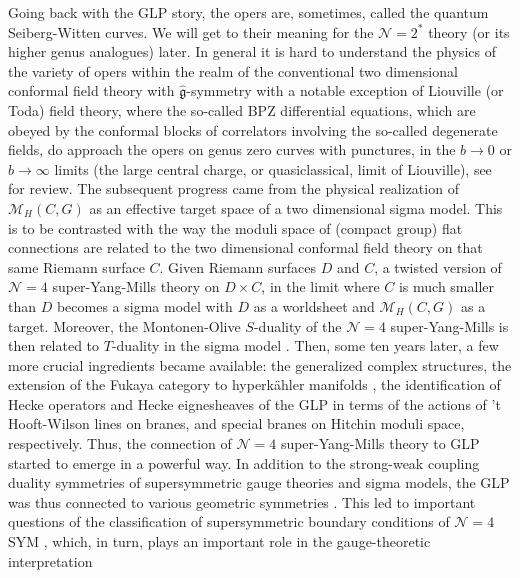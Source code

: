 \documentclass[12pt]{article}
\newcommand\CalN{\mathcal{N}}
\newcommand\CalM{\mathcal{M}}
\begin{document}
Going back with the GLP story, the opers are, sometimes, called the quantum Seiberg-Witten curves.  We will get to their meaning for the ${\CalN}=2^{*}$ theory (or its higher genus analogues) later. 
In general it is hard
to understand the physics of the variety of opers within the realm of the conventional
two dimensional conformal field theory with $\widehat{\mathfrak{g}}$-symmetry with a notable exception of Liouville (or Toda) field theory, where the
so-called BPZ differential equations, which are obeyed
by the conformal blocks of correlators involving the so-called
degenerate fields, do approach the opers on genus zero curves with punctures, in the $b \to 0$ or $b \to \infty$ limits
(the large central charge, or quasiclassical, limit of Liouville), see \cite{Teschner:2010je} for review. 
The subsequent progress came from the physical realization of ${\CalM}_{H}(C, G)$ as an effective target space of a two dimensional 
sigma model. This is to be contrasted with the way the moduli space of (compact group) flat connections are related to the two dimensional conformal field theory on that same Riemann surface $C$. 
Given Riemann surfaces $D$ and $C$, a twisted version of ${\CalN}=4$ super-Yang-Mills theory 
on $D \times C$, in the limit where $C$ is much smaller than $D$ 
becomes a sigma model with $D$ as a worldsheet and ${\CalM}_{H}(C, G)$ as a target. Moreover, the Montonen-Olive $S$-duality of the ${\CalN}=4$ super-Yang-Mills is then related to $T$-duality in the sigma model
\cite{Bershadsky:1995vm,Harvey:1995tg}. Then, some ten years later, a few more crucial ingredients became available: the
generalized complex structures, the extension of the Fukaya category to hyperk{\"a}hler manifolds \cite{Kapustin:2001ij}, the identification of Hecke operators and Hecke eignesheaves 
of the GLP in terms of the actions of 't Hooft-Wilson lines on branes, 
and special branes on Hitchin moduli space, respectively. Thus, the connection of ${\CalN}=4$ super-Yang-Mills theory to GLP started to emerge \cite{Kapustin:2006pk}
in a powerful way. In addition to the strong-weak coupling duality symmetries of supersymmetric gauge theories 
and sigma models, the GLP was thus connected to various geometric symmetries 
\cite{Balasubramanian:2017gxc,Gukov:2006jk,
Kapustin:2006pk,Teschner:2010je,Witten:2007td,
Witten:2008ep,Witten:2009at,
Witten:2009mh,Witten:2015dta}. This led to important questions of the classification of supersymmetric boundary conditions of ${\CalN}=4$ SYM 
\cite{Gaiotto:2008sa,Gaiotto:2008sd,Gaiotto:2008ak}, which, 
in turn, 
plays an important role in the gauge-theoretic interpretation 
\end{document}
